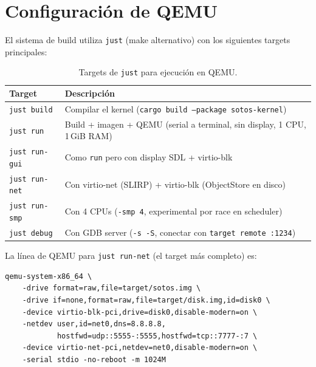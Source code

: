 \documentclass[11pt,twoside,openright]{book}
\theoremstyle{definition}
\theoremstyle{plain}
\theoremstyle{remark}
\begin{document}
\section{Configuración de QEMU}
\label{sec:qemu-config}

El sistema de build utiliza \texttt{just} (make alternativo) con los siguientes
targets principales:

\begin{table}[ht]
\centering
\caption{Targets de \texttt{just} para ejecución en QEMU.}
\label{tab:just-targets}
\begin{tabular}{@{}lp{9cm}@{}}
\toprule
\textbf{Target} & \textbf{Descripción} \\
\midrule
\texttt{just build}    & Compilar el kernel (\texttt{cargo build --package sotos-kernel}) \\
\texttt{just run}      & Build + imagen + QEMU (serial a terminal, sin display, 1 CPU, 1\,GiB RAM) \\
\texttt{just run-gui}  & Como \texttt{run} pero con display SDL + virtio-blk \\
\texttt{just run-net}  & Con virtio-net (SLIRP) + virtio-blk (ObjectStore en disco) \\
\texttt{just run-smp}  & Con 4 CPUs (\texttt{-smp 4}, experimental por race en scheduler) \\
\texttt{just debug}    & Con GDB server (\texttt{-s -S}, conectar con \texttt{target remote :1234}) \\
\bottomrule
\end{tabular}
\end{table}

La línea de QEMU para \texttt{just run-net} (el target más completo) es:

\begin{lstlisting}[language={},basicstyle=\ttfamily\scriptsize,frame=single,breaklines=true,caption={Comando QEMU para \texttt{just run-net}.},label={lst:qemu-cmd}]
qemu-system-x86_64 \
    -drive format=raw,file=target/sotos.img \
    -drive if=none,format=raw,file=target/disk.img,id=disk0 \
    -device virtio-blk-pci,drive=disk0,disable-modern=on \
    -netdev user,id=net0,dns=8.8.8.8,
            hostfwd=udp::5555-:5555,hostfwd=tcp::7777-:7 \
    -device virtio-net-pci,netdev=net0,disable-modern=on \
    -serial stdio -no-reboot -m 1024M
\end{lstlisting}
\end{document}

